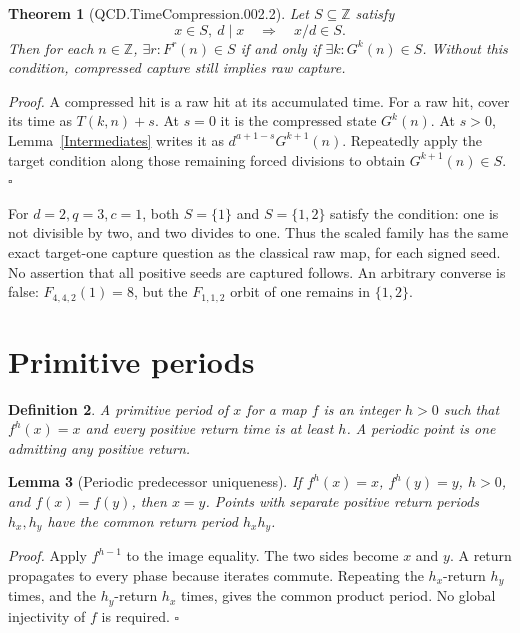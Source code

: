 \documentclass[11pt,letterpaper]{article}
\newcommand{\Z}{\mathbb{Z}}
\newtheorem{theorem}{Theorem}
\newtheorem{lemma}[theorem]{Lemma}
\newtheorem{definition}[theorem]{Definition}
\newenvironment{proof}{\noindent\textit{Proof.}}{\hfill\(\square\)}
\begin{document}
\begin{theorem}[QCD.TimeCompression.002.2]\label{Capture}
Let \(S\subseteq\Z\) satisfy
\[
x\in S,\ d\mid x\quad\Longrightarrow\quad x/d\in S.
\]
Then for each \(n\in\Z\), \(\exists r:F^r(n)\in S\) if and only if
\(\exists k:G^k(n)\in S\). Without this condition, compressed capture still
implies raw capture.
\end{theorem}
\begin{proof}
A compressed hit is a raw hit at its accumulated time. For a raw hit, cover its
time as \(T(k,n)+s\). At \(s=0\) it is the compressed state \(G^k(n)\).
At \(s>0\), Lemma~\ref{Intermediates} writes it as
\(d^{a+1-s}G^{k+1}(n)\). Repeatedly apply the target condition along those
remaining forced divisions to obtain \(G^{k+1}(n)\in S\).
\end{proof}

For \(d=2,q=3,c=1\), both \(S=\{1\}\) and \(S=\{1,2\}\) satisfy the
condition: one is not divisible by two, and two divides to one.
Thus the scaled family has the same exact target-one capture question as the
classical raw map, for each signed seed. No assertion that all positive seeds
are captured follows. An arbitrary converse is false: \(F_{4,4,2}(1)=8\), but
the \(F_{1,1,2}\) orbit of one remains in \(\{1,2\}\).

\section{Primitive periods}

\begin{definition}
A primitive period of \(x\) for a map \(f\) is an integer \(h>0\) such that
\(f^h(x)=x\) and every positive return time is at least \(h\).
A periodic point is one admitting any positive return.
\end{definition}

\begin{lemma}[Periodic predecessor uniqueness]\label{Predecessors}
If \(f^h(x)=x\), \(f^h(y)=y\), \(h>0\), and \(f(x)=f(y)\), then \(x=y\).
Points with separate positive return periods \(h_x,h_y\) have the common return
period \(h_xh_y\).
\end{lemma}
\begin{proof}
Apply \(f^{h-1}\) to the image equality. The two sides become \(x\) and \(y\).
A return propagates to every phase because iterates commute. Repeating the
\(h_x\)-return \(h_y\) times, and the \(h_y\)-return \(h_x\) times, gives
the common product period. No global injectivity of \(f\) is required.
\end{proof}
\end{document}
